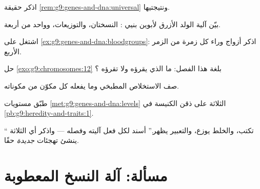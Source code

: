 \begin{exercise}[$\star$]\label{exo:g9:genes-and-dna:6}
اذكر حقيقة \cref{rem:g9:genes-and-dna:universal}
ونتيجتيها.
\end{exercise}

\begin{exercise}[$\star\star$]\label{exo:g9:genes-and-dna:7}
بيّن آلية الولد الأزرق  لأبوين بنيي :
النسختان، والتوزيعات، وواحد من أربعة.
\end{exercise}

\begin{exercise}[$\star\star$]\label{exo:g9:genes-and-dna:8}
اشتغل على \cref{ex:g9:genes-and-dna:bloodgroups}: اذكر
أزواج  وراء كل زمرة من الزمر الأربع.
\end{exercise}

\begin{exercise}[$\star\star$]\label{exo:g9:genes-and-dna:9}
حل \cref{exo:g9:chromosomes:12} بلغة هذا الفصل: ما الذي
يقرؤه  ولا تقرؤه  ؟
\end{exercise}

\begin{exercise}[$\star\star$]\label{exo:g9:genes-and-dna:10}
صف الاستخلاص المطبخي وما يفعله كل مكوّن من مكوناته.
\end{exercise}

\begin{exercise}[$\star\star$]\label{exo:g9:genes-and-dna:11}
طبّق مستويات \cref{met:g9:genes-and-dna:levels} الثلاثة
على ذقن الكنيسة في \cref{pb:g9:heredity-and-traits:1}.
\end{exercise}

\begin{exercise}[$\star\star\star$]\label{exo:g9:genes-and-dna:12}
`` تكتب، والخلط يوزع، والتعبير يظهر.'' أسند لكل
فعل آليته وفصله --- واذكر أي الثلاثة ينشئ تهجئات
\emph{جديدة} حقًا.
\end{exercise}

\section{مسألة: آلة النسخ المعطوبة}

